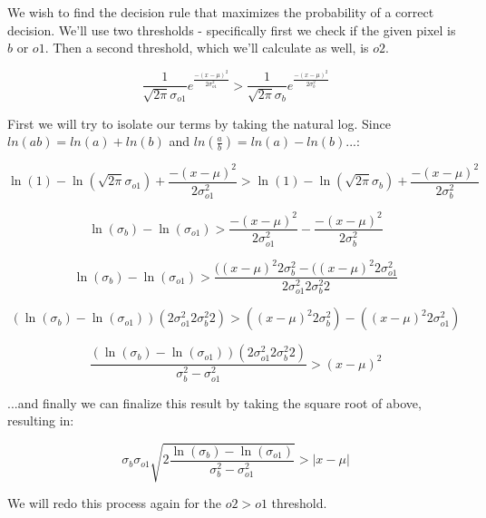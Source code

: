 \documentclass{article}
\begin{document}
We wish to find the decision rule that maximizes the probability of a correct decision. We'll use two thresholds - specifically first we check if the given pixel is ${b}$ or $o1$. Then a second threshold, which we'll calculate as well, is ${o2}$.

\begin {equation}
    \frac{1}{\sqrt{2\pi}\sigma_{o1}}e^{\frac{-(x-\mu)^2}{2\sigma^2_{o1}}}
    >
    \frac{1}{\sqrt{2\pi}\sigma_b}e^{\frac{-(x-\mu)^2}{2\sigma^2_b}}
\end{equation}

First we will try to isolate our terms by taking the natural log. Since $ln(ab) = ln(a) + ln(b)$ and $ln(\frac{a}{b}) = ln(a) - ln(b)$...:

\begin{equation}
    \ln(1) - \ln(\sqrt{2\pi}\sigma_{o1}) + \frac{-(x-\mu)^2}{2\sigma^2_{o1}}
    >
    \ln(1) - \ln(\sqrt{2\pi}\sigma_b) + \frac{-(x-\mu)^2}{2\sigma^2_b}
\end{equation}

\begin{equation}
    \ln(\sigma_b) - \ln(\sigma_{o1}) > \frac{-(x-\mu)^2}{2\sigma^2_{o1}} - \frac{-(x-\mu)^2}{2\sigma^2_b}
\end{equation}

\begin{equation}
    \ln(\sigma_b) - \ln(\sigma_{o1}) > \frac{((x-\mu)^2 2\sigma_b^2 - ((x-\mu)^2 2\sigma_{o1}^2 }{2\sigma^2_{o1}2 \sigma^2_b2}
\end{equation}

\begin{equation}
    (\ln(\sigma_b) - \ln(\sigma_{o1})) (2\sigma^2_{o1}2 \sigma^2_b2)  > ((x-\mu)^2 2\sigma_b^2) - ((x-\mu)^2 2\sigma_{o1}^2)
\end{equation}

\begin{equation}
    \frac{(\ln(\sigma_b) - \ln(\sigma_{o1})) (2\sigma^2_{o1}2 \sigma^2_b2)}{\sigma_b^2 - \sigma_{o1}^2} > (x - \mu)^2
\end{equation}

...and finally we can finalize this result by taking the square root of above, resulting in:

\begin{equation}
    \sigma_b \sigma_{o1} \sqrt{2\frac{\ln(\sigma_b) - \ln(\sigma_{o1})}{\sigma_b^2 - \sigma_{o1}^2}} > \vert x - \mu \vert
\end{equation}

We will redo this process again for the $o2 > o1$ threshold.
\end{document}
